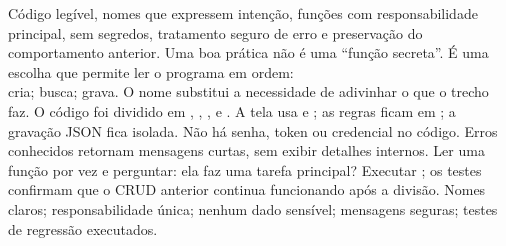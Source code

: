 
 Código legível, nomes que expressem intenção, funções com responsabilidade principal, sem segredos, tratamento seguro de erro e preservação do comportamento anterior.
 Uma boa prática não é uma ``função secreta''. É uma escolha que permite ler o programa em ordem: \\  cria;  busca;  grava. O nome substitui a necessidade de adivinhar o que o trecho faz.
 O código foi dividido em , , ,  e . A tela usa  e ; as regras ficam em ; a gravação JSON fica isolada. Não há senha, token ou credencial no código. Erros conhecidos retornam mensagens curtas, sem exibir detalhes internos.
 Ler uma função por vez e perguntar: ela faz uma tarefa principal? Executar ; os testes confirmam que o CRUD anterior continua funcionando após a divisão.
 Nomes claros; responsabilidade única; nenhum dado sensível; mensagens seguras; testes de regressão executados.

